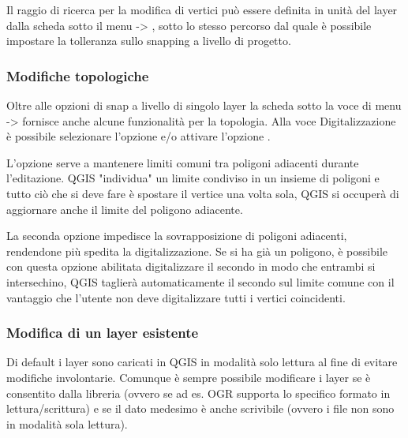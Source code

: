 Il raggio di ricerca per la modifica di vertici può essere definita in unità
del layer dalla scheda  sotto il menu
 -> , sotto lo
stesso percorso dal quale è possibile impostare la tolleranza sullo snapping a
livello di progetto.

\subsubsection{Modifiche topologiche}

Oltre alle opzioni di snap a livello di singolo layer la scheda
 sotto la voce di menu  ->
 fornisce anche alcune
funzionalità per la topologia. 
Alla voce Digitalizzazione è possibile selezionare l'opzione  e/o attivare l'opzione .


L'opzione  serve a mantenere limiti
comuni tra poligoni adiacenti durante l'editazione. QGIS "individua" un limite
condiviso in un insieme di poligoni e tutto ciò che si deve fare è spostare il
vertice una volta sola, QGIS si occuperà di aggiornare anche il limite del
poligono adiacente.


La seconda opzione 
impedisce la sovrapposizione di poligoni adiacenti, rendendone più spedita la
digitalizzazione. Se si ha già un poligono, è possibile con questa opzione
abilitata digitalizzare il secondo in modo che entrambi si intersechino, QGIS
taglierà automaticamente il secondo sul limite comune con il vantaggio che
l'utente non deve digitalizzare tutti i vertici coincidenti.

\subsubsection{Modifica di un layer esistente}
\label{sec:edit_existing_layer}

Di default i layer sono caricati in QGIS in modalità solo lettura al fine di
evitare modifiche involontarie.
Comunque è sempre possibile modificare i layer se è consentito dalla
libreria (ovvero se ad es. OGR supporta lo specifico formato in
lettura/scrittura) e se il dato medesimo è anche scrivibile (ovvero i file
non sono in modalità sola lettura).

